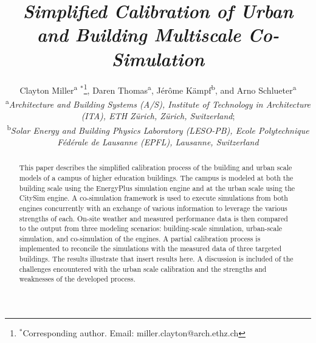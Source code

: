 \documentclass{tBPS2e}
\theoremstyle{plain}
\theoremstyle{definition}
\theoremstyle{remark}
\begin{document}


\title{\textit{Simplified Calibration of Urban and Building Multiscale Co-Simulation}}

\author{Clayton Miller\textsuperscript{a}%
$^{\ast}$\thanks{$^\ast$Corresponding author. Email: miller.clayton@arch.ethz.ch}, 
Daren Thomas\textsuperscript{a},
J\'er\^ome K\"ampf\textsuperscript{b},
and Arno Schlueter\textsuperscript{a}\\
\vspace{6pt}
\textsuperscript{a}{\em Architecture and Building Systems (A/S), Institute of Technology in Architecture (ITA), ETH Z\"urich, Z\"urich, Switzerland};\\
\textsuperscript{b}{\em Solar Energy and Building Physics Laboratory (LESO-PB), Ecole Polytechnique F\'ed\'erale de Lausanne (EPFL), Lausanne, Switzerland}
}

\maketitle

\begin{abstract}
This paper describes the simplified calibration process of the building and urban scale models of a campus of higher education buildings. The campus is modeled at both the building scale using the EnergyPlus simulation engine and at the urban scale using the CitySim engine. A co-simulation framework is used to execute simulations from both engines concurrently with an exchange of various information to leverage the various strengths of each. On-site weather and measured performance data is then compared to the output from three modeling scenarios: building-scale simulation, urban-scale simulation, and co-simulation of the engines. A partial calibration process is implemented to reconcile the simulations with the measured data of three targeted buildings. The results illustrate that {\color{red}insert results here}. A discussion is included of the challenges encountered with the urban scale calibration and the strengths and weaknesses of the developed process.
\end{abstract}

\end{document}
